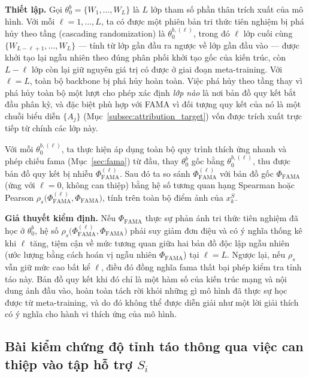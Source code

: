 \textbf{Thiết lập.} Gọi $\theta_0^{b} = \{W_1, \dots, W_L\}$ là $L$ lớp tham số phần thân trích xuất của mô hình. Với mỗi $\ell = 1, \dots, L$, ta có được một phiên bản tri thức tiên nghiệm bị phá hủy theo tầng (cascading randomization) là $\theta_0^{b,(\ell)}$, trong đó $\ell$ lớp cuối cùng $\{W_{L-\ell+1}, \dots, W_L\}$ — tính từ lớp gần đầu ra ngược về lớp gần đầu vào — được khởi tạo lại ngẫu nhiên theo đúng phân phối khởi tạo gốc của kiến trúc, còn $L-\ell$ lớp còn lại giữ nguyên giá trị có được ở giai đoạn meta-training. Với $\ell = L$, toàn bộ backbone bị phá hủy hoàn toàn. Việc phá hủy theo tầng thay vì phá hủy toàn bộ một lượt cho phép xác định \emph{lớp nào} là nơi bản đồ quy kết bắt đầu phân kỳ, và đặc biệt phù hợp với FAMA vì đối tượng quy kết của nó là một chuỗi biểu diễn $\{A_j\}$ (Mục~\ref{subsec:attribution_target}) vốn được trích xuất trực tiếp từ chính các lớp này.
 
Với mỗi $\theta_0^{b,(\ell)}$, ta thực hiện áp dụng toàn bộ quy trình thích ứng nhanh và phép chiếu \acrshort{fama} (Mục~\ref{sec:fama}) từ đầu, thay $\theta_0^b$ gốc bằng $\theta_0^{b,(\ell)}$, thu được bản đồ quy kết bị nhiễu $\Phi_{\text{FAMA}}^{(\ell)}$. Sau đó ta so sánh $\Phi_{\text{FAMA}}^{(\ell)}$ với bản đồ gốc $\Phi_{\text{FAMA}}$ (ứng với $\ell = 0$, không can thiệp) bằng hệ số tương quan hạng Spearman hoặc Pearson $\rho_s\big(\Phi_{\text{FAMA}}^{(\ell)}, \Phi_{\text{FAMA}}\big)$, tính trên toàn bộ điểm ảnh của $x_k^S$.
 
\textbf{Giả thuyết kiểm định.} Nếu $\Phi_{\text{FAMA}}$ thực sự phản ánh tri thức tiên nghiệm đã học ở $\theta_0^b$, hệ số $\rho_s\big(\Phi_{\text{FAMA}}^{(\ell)}, \Phi_{\text{FAMA}}\big)$ phải suy giảm đơn điệu và có ý nghĩa thống kê khi $\ell$ tăng, tiệm cận về mức tương quan giữa hai bản đồ độc lập ngẫu nhiên (ước lượng bằng cách hoán vị ngẫu nhiên $\Phi_{\text{FAMA}}$) tại $\ell = L$. Ngược lại, nếu $\rho_s$ vẫn giữ mức cao bất kể $\ell$, điều đó đồng nghĩa \acrshort{fama} thất bại phép kiểm tra tỉnh táo này. Bản đồ quy kết khi đó chỉ là một hàm số của kiến trúc mạng và nội dung ảnh đầu vào, hoàn toàn tách rời khỏi những gì mô hình đã thực sự học được từ meta-training, và do đó không thể được diễn giải như một lời giải thích có ý nghĩa cho hành vi thích ứng của mô hình.
 
\subsection{Bài kiểm chứng độ tỉnh táo thông qua việc can thiệp vào tập hỗ trợ $S_i$}
\label{subsec:sanity_support}
 
